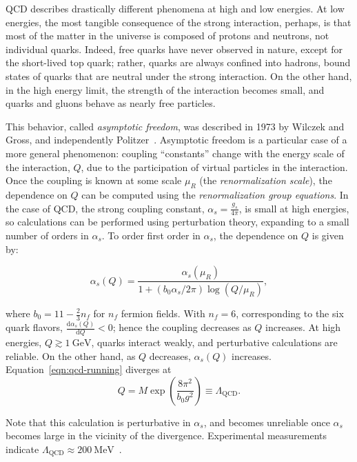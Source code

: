QCD describes drastically different phenomena at high and low energies. At low energies, the most tangible consequence of the strong interaction, perhaps, is that most of the matter in the universe is composed of protons and neutrons, not individual quarks. Indeed, free quarks have never observed in nature, except for the short-lived top quark; rather, quarks are always confined into hadrons, bound states of quarks that are neutral under the strong interaction. On the other hand, in the high energy limit, the strength of the interaction becomes small, and quarks and gluons behave as nearly free particles. 

This behavior, called \emph{asymptotic freedom}, was described in 1973 by Wilczek and Gross, and independently Politzer~\cite{Gross:1973id,Politzer:1973fx}. Asymptotic freedom is a particular case of a more general phenomenon: coupling ``constants'' change with the energy scale of the interaction, $Q$, due to the participation of virtual particles in the interaction. Once the coupling is known at some scale $\mu_R$ (the \emph{renormalization scale}), the dependence on $Q$ can be computed using the \emph{renormalization group equations}. In the case of QCD, the strong coupling constant, $\alpha_s=\frac{g_s}{4\pi}$, is small at high energies, so calculations can be performed using perturbation theory, expanding to a small number of orders in $\alpha_s$. To order first order in $\alpha_s$, the dependence on $Q$ is given by:

\begin{equation}\label{eqn:qcd-running}
\alpha_s(Q) = \frac{\alpha_s(\mu_R)}{1 + (b_0 \alpha_s/2\pi)\log(Q/\mu_R)},
\end{equation}

where $b_0=11-\frac{2}{3}n_f$ for $n_f$ fermion fields. With $n_f=6$, corresponding to the six quark flavors, $\frac{\mathrm{d}\alpha_s(Q)}{\mathrm{d}Q}<0$; hence the coupling decreases as $Q$ increases. At high energies, $Q\gtrsim \SI{1}{\giga\electronvolt}$, quarks interact weakly, and perturbative calculations are reliable. On the other hand, as $Q$ decreases, $\alpha_s(Q)$ increases. Equation~\ref{eqn:qcd-running} diverges at
\begin{equation}
Q=M\exp\left(\frac{8\pi^2}{b_0g^2}\right) \equiv \Lambda_{\mathrm{QCD}}.
\end{equation}

Note that this calculation is perturbative in $\alpha_s$, and becomes unreliable once $\alpha_s$ becomes large in the vicinity of the divergence. Experimental measurements indicate $\Lambda_{\mathrm{QCD}}\approx \SI{200}{\mega\electronvolt}$~\cite{Campbell:1998gr}. 

